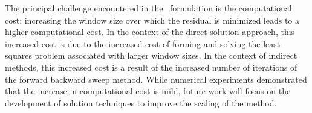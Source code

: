 \documentclass[3p,computermodern,10pt]{elsarticle}
\begin{document}
 
The principal challenge encountered in the \methodAcronym\ formulation is the computational cost: increasing the window size over which the residual is minimized leads to a higher computational cost. In the context of the direct solution approach, this increased cost is due to the increased cost of forming and solving the least-squares problem associated with larger window sizes. In the context of indirect methods, this increased cost is a result of the increased number of iterations of the forward backward sweep method. While numerical experiments demonstrated that the increase in computational cost is mild, future work will focus on the development of solution techniques to improve the scaling of the method.

 


\end{document}
